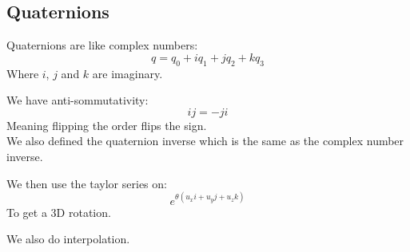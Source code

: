 \documentclass[12pt]{article}
\begin{document}
\newpage

\subsection*{Quaternions}

Quaternions are like complex numbers:
\[ q = q_0 + iq_1 + jq_2 + kq_3 \]
Where $i$, $j$ and $k$ are imaginary.

We have anti-sommutativity:
\[ ij = -ji \]
Meaning flipping the order flips the sign. \\

We also defined the quaternion inverse which
is the same as the complex number inverse.

We then use the taylor series on:
\[ e^{\theta(u_xi + u_yj + u_zk)} \]
To get a 3D rotation.

We also do interpolation.
\end{document}
